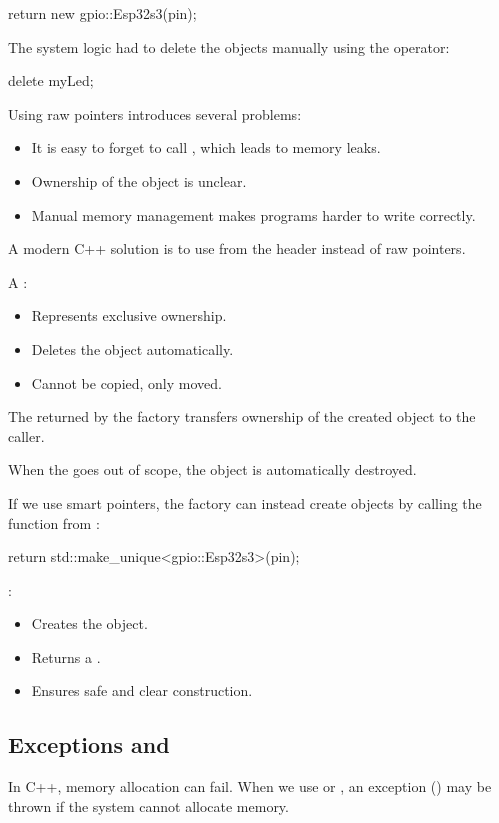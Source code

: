 \begin{cppcode}
return new gpio::Esp32s3(pin);
\end{cppcode}

\noindent The system logic had to delete the objects manually using the  operator:

\begin{cppcode}
delete myLed;
\end{cppcode}

\noindent Using raw pointers introduces several problems:
\begin{itemize}
  \item It is easy to forget to call , which leads to memory leaks.
  \item Ownership of the object is unclear.
  \item Manual memory management makes programs harder to write correctly.
\end{itemize}
A modern C++ solution is to use  from the  header instead of
raw pointers.

A :
\begin{itemize}
  \item Represents exclusive ownership.
  \item Deletes the object automatically.
  \item Cannot be copied, only moved.
\end{itemize}
The  returned by the factory transfers ownership of the created object to the
caller.

When the  goes out of scope, the object is automatically destroyed.

If we use smart pointers, the factory can instead create objects by calling the
 function from :

\begin{cppcode}
return std::make_unique<gpio::Esp32s3>(pin);
\end{cppcode}

\noindent {}:
\begin{itemize}
  \item Creates the object.
  \item Returns a .
  \item Ensures safe and clear construction.
\end{itemize}

\subsection{Exceptions and }
\label{c4:sec:noexcept}
In C++, memory allocation can fail. When we use  or , an
exception () may be thrown if the system cannot allocate memory.

